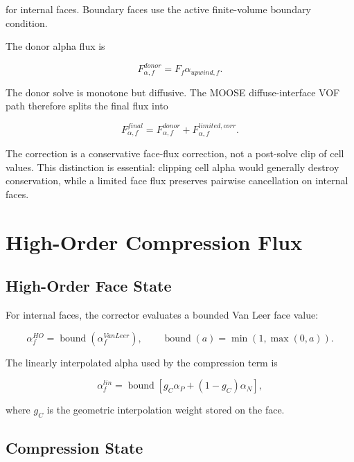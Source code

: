 \documentclass[11pt]{article}
\newcommand{\bnd}{\operatorname{bound}}
\begin{document}
for internal faces.  Boundary faces use the active finite-volume boundary
condition.

The donor alpha flux is

\begin{equation}
  F_{\alpha,f}^{donor}=F_f\alpha_{upwind,f}.
  \label{eq:donor-flux}
\end{equation}

The donor solve is monotone but diffusive.  The MOOSE diffuse-interface VOF path
therefore splits the final flux into

\begin{equation}
  F_{\alpha,f}^{final}
  =
  F_{\alpha,f}^{donor}
  +
  F_{\alpha,f}^{limited,corr}.
  \label{eq:flux-split}
\end{equation}

The correction is a conservative face-flux correction, not a post-solve clip of
cell values.  This distinction is essential: clipping cell alpha would generally
destroy conservation, while a limited face flux preserves pairwise cancellation
on internal faces.

\section{High-Order Compression Flux}

\subsection{High-Order Face State}

For internal faces, the corrector evaluates a bounded Van Leer face value:

\begin{equation}
  \alpha_f^{HO}
  =
  \bnd\left(\alpha_f^{VanLeer}\right),
  \qquad
  \bnd(a)=\min(1,\max(0,a)).
\end{equation}

The linearly interpolated alpha used by the compression term is

\begin{equation}
  \alpha_f^{lin}
  =
  \bnd
  \left[
    g_C\alpha_P+(1-g_C)\alpha_N
  \right],
  \label{eq:linear-alpha-face}
\end{equation}

where \(g_C\) is the geometric interpolation weight stored on the face.

\subsection{Compression State}
\end{document}
